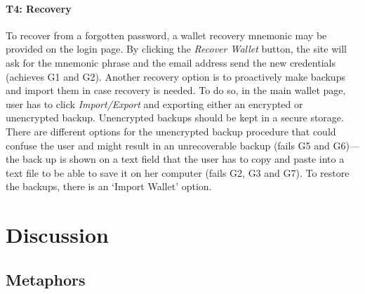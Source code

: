 \paragraph{T4: Recovery} To recover from a forgotten password, a wallet recovery mnemonic may be provided on the login page. By clicking the \emph{Recover Wallet} button, the site will ask for the mnemonic phrase and the email address send the new credentials (achieves G1 and G2). Another recovery option is to proactively make backups and import them in case recovery is needed. To do so, in the main wallet page, user has to click \emph{Import/Export} and exporting either an encrypted or unencrypted backup. Unencrypted backups should be kept in a secure storage. There are different options for the unencrypted backup procedure that could confuse the user and might result in an unrecoverable backup (fails G5 and G6)---the back up is shown on a text field that the user has to copy and paste into a text file to be able to save it on her computer (fails G2, G3 and G7). To restore the backups, there is an `Import Wallet' option.


\section{Discussion}





\subsection{Metaphors}

